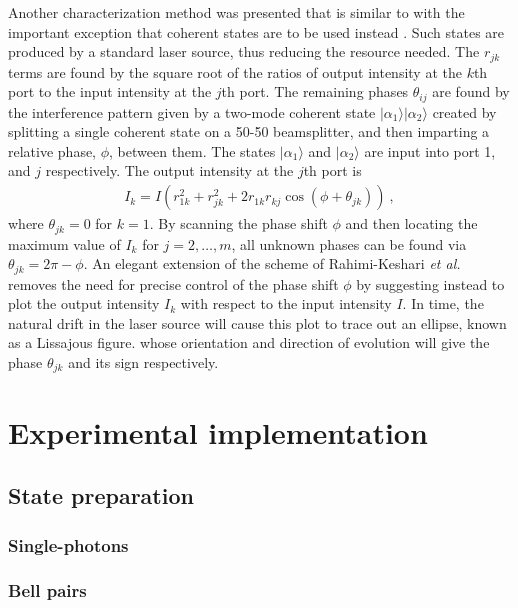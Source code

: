 \documentclass[aps,rmp,twocolumn,amsmath,amssymb,nofootinbib,superscriptaddress]{revtex4}
\newcommand{\ket}[1]{|#1\rangle}
\newcommand{\sihui}[1]{{\color{Orchid}{#1}}}
\begin{document}
Another characterization method was presented that is similar to \cite{bib:Laing12} with the important exception that coherent states are to be used instead \cite{bib:Rahimi-Keshari13,bib:Heilmann15}. Such states are produced by a standard laser source, thus reducing the resource needed. The $r_{jk}$ terms are found by the square root of the ratios of output intensity at the $k$th port to the input intensity at the $j$th port. The remaining phases $\theta_{ij}$ are found by the interference pattern given by a two-mode coherent state $\ket{\alpha_1}\ket{\alpha_2}$ created by splitting a single coherent state on a 50-50 beamsplitter, and then imparting a relative phase, $\phi$, between them. The states $\ket{\alpha_1}$ and $\ket{\alpha_2}$ are input into port 1, and $j$ respectively. The output intensity at the $j$th port is 
\begin{align}
I_k=I(r_{1k}^2+r_{jk}^2+2 r_{1k}r_{kj}\cos(\phi+\theta_{jk})) \ ,
\end{align}
where $\theta_{jk}=0$ for $k=1$. By scanning the phase shift $\phi$ and then locating the maximum value of $I_k$ for $j=2,\ldots, m$, all unknown phases can be found via $\theta_{jk}=2\pi-\phi$. An elegant extension of the scheme of Rahimi-Keshari {\it et al.} removes the need for precise control of the phase shift $\phi$ \cite{bib:Heilmann15} by suggesting instead to plot the output intensity $I_k$ with respect to the input intensity $I$. In time, the natural drift in the laser source will cause this plot to trace out an ellipse, known as a Lissajous figure. whose orientation and direction of evolution will give the phase $\theta_{jk}$ and its sign respectively.

\section{Experimental implementation}

\subsection{State preparation}

\subsubsection{Single-photons}

\sihui{ SPDC, quantum-dot micropillar sources}

\subsubsection{Bell pairs}
\end{document}

